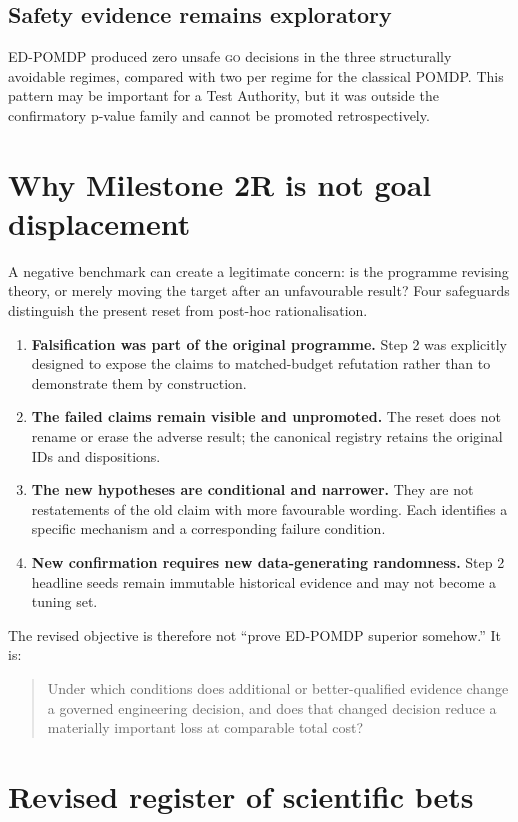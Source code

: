\documentclass[11pt,a4paper]{article}
\newcommand{\go}{\textsc{go}}
\begin{document}
\subsection{Safety evidence remains exploratory}
ED-POMDP produced zero unsafe \go{} decisions in the three structurally avoidable regimes, compared with two per regime for the classical POMDP. This pattern may be important for a Test Authority, but it was outside the confirmatory p-value family and cannot be promoted retrospectively.

\section{Why Milestone 2R is not goal displacement}

A negative benchmark can create a legitimate concern: is the programme revising theory, or merely moving the target after an unfavourable result? Four safeguards distinguish the present reset from post-hoc rationalisation.

\begin{enumerate}
  \item \textbf{Falsification was part of the original programme.} Step 2 was explicitly designed to expose the claims to matched-budget refutation rather than to demonstrate them by construction.
  \item \textbf{The failed claims remain visible and unpromoted.} The reset does not rename or erase the adverse result; the canonical registry retains the original IDs and dispositions.
  \item \textbf{The new hypotheses are conditional and narrower.} They are not restatements of the old claim with more favourable wording. Each identifies a specific mechanism and a corresponding failure condition.
  \item \textbf{New confirmation requires new data-generating randomness.} Step 2 headline seeds remain immutable historical evidence and may not become a tuning set.
\end{enumerate}

The revised objective is therefore not ``prove ED-POMDP superior somehow.'' It is:
\begin{quote}
Under which conditions does additional or better-qualified evidence change a governed engineering decision, and does that changed decision reduce a materially important loss at comparable total cost?
\end{quote}

\section{Revised register of scientific bets}
\end{document}
